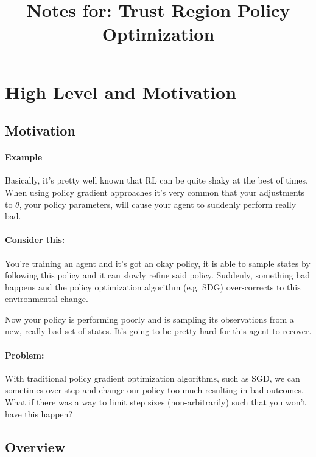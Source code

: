 \documentclass{article}
\title{Notes for: Trust Region Policy Optimization}
\begin{document}
\maketitle

\section[high]{High Level and Motivation}
\label{cha:high-level-motiv}

\subsection[motivation]{Motivation}
\label{part:motivation}

\paragraph[example]{Example} Basically, it's pretty well known that RL can be quite shaky at the best of times. When using policy gradient approaches it's very common that your adjustments to \(\theta\), your policy parameters, will cause your agent to suddenly perform really bad.

\paragraph{Consider this:}
You're training an agent and it's got an okay policy, it is able to sample states by following this policy and it can slowly refine said policy. Suddenly, something bad happens and the policy optimization algorithm (e.g. SDG) over-corrects to this environmental change.

Now your policy is performing poorly and is sampling its observations from a new, really bad set of states. It's going to be pretty hard for this agent to recover. 

\paragraph{Problem:} With traditional policy gradient optimization algorithms, such as SGD, we can sometimes over-step and change our policy too much resulting in bad outcomes. What if there was a way to limit step sizes (non-arbitrarily) such that you won't have this happen?

\subsection[overview]{Overview}
\label{part:overview}
\end{document}

